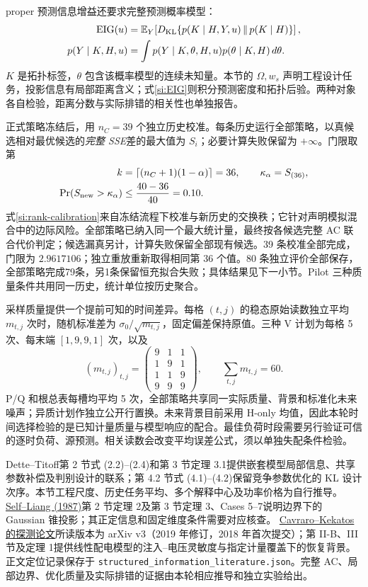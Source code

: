 \documentclass[UTF8,fontset=fandol,11pt,a4paper]{ctexart}
\begin{document}
proper 预测信息增益还要求完整预测概率模型：
\begin{align}
 \operatorname{EIG}(u)&=\mathbb E_Y\!\left[
 D_{\rm KL}\{p(K\mid H,Y,u)\,\|\,p(K\mid H)\}\right],\nonumber\\
 p(Y\mid K,H,u)&=\int p(Y\mid K,\theta,H,u)p(\theta\mid K,H)\,d\theta.
 \label{si:EIG}
\end{align}
$K$ 是拓扑标签，$\theta$ 包含该概率模型的连续未知量。本节的 $\Omega,w_s$ 声明工程设计任务，投影信息有局部距离含义；式\eqref{si:EIG}则积分预测密度和拓扑后验。两种对象各自检验，距离分数与实际排错的相关性也单独报告。

正式策略冻结后，用 $n_C=39$ 个独立历史校准。每条历史运行全部策略，以真候选相对最优候选的\emph{完整 SSE}差的最大值为 $S_i$；必要计算失败保留为 $+\infty$。门限取第
\begin{align}
 k&=\lceil(n_C+1)(1-\alpha)\rceil=36,\qquad
 \kappa_\alpha=S_{(36)},\nonumber\\
 \Pr(S_{\rm new}>\kappa_\alpha)&\le\frac{40-36}{40}=0.10.
 \label{si:rank-calibration}
\end{align}
式\eqref{si:rank-calibration}来自冻结流程下校准与新历史的交换秩；它针对声明模拟混合中的边际风险。全部策略已纳入同一个最大统计量，最终按各候选完整 AC 联合代价判定；候选漏真另计，计算失败保留全部现有候选。39 条校准全部完成，门限为 $2.9617106$；独立重放重新取得相同第 36 个值。80 条独立评价全部保存，全部策略完成79条，另1条保留恒充拟合失败；具体结果见下一小节。Pilot 三种质量条件共用同一历史，统计单位按历史聚合。

采样质量提供一个提前可知的时间差异。每格 $(t,j)$ 的稳态原始读数独立平均 $m_{t,j}$ 次时，随机标准差为 $\sigma_0/\sqrt{m_{t,j}}$，固定偏差保持原值。三种 V 计划为每格 5 次、每末端 $[1,9,9,1]$ 次，以及
\begin{equation}
 (m_{t,j})_{t,j}=\begin{pmatrix}9&1&1\\1&9&1\\1&1&9\\9&9&9\end{pmatrix},
 \qquad\sum_{t,j}m_{t,j}=60.
 \label{si:public-quality}
\end{equation}
P/Q 和根总表每槽均平均 5 次，全部策略共享同一实际质量、背景和标准化未来噪声；异质计划作独立公开行置换。未来背景目前采用 H-only 均值，因此本轮时间选择检验的是已知计量质量与模型响应的配合。最佳负荷时段需要另行验证可信的逐时负荷、源预测。相关读数会改变平均误差公式，须以单独失配条件检验。

Dette--Titoff\cite{dette}第 2 节式 (2.2)--(2.4)和第 3 节定理 3.1提供嵌套模型局部信息、共享参数补偿及判别设计的联系；第 4.2 节式 (4.1)--(4.2)保留竞争参数优化的 KL 设计次序。本节工程尺度、历史任务平均、多个解释中心及功率价格为自行推导。
\href{https://www.stat.cmu.edu/~brian/763-2015/week06/papers/self-liang-1987.pdf}{Self--Liang (1987)}第 2 节定理 2及第 3 节定理 3、Cases 5--7说明边界下的 Gaussian 锥投影；其正定信息和固定维度条件需要对应核查。
\href{https://arxiv.org/pdf/1802.06027}{Cavraro--Kekatos 的探测论文}所读版本为 arXiv v3（2019 年修订，2018 年首次提交）；第 II-B、III 节及定理 1提供线性配电模型的注入--电压灵敏度与指定计量覆盖下的恢复背景。正文定位记录保存于 \texttt{structured\_information\_literature.json}。完整 AC、局部边界、优化质量及实际排错的证据由本轮相应推导和独立实验给出。
\end{document}
